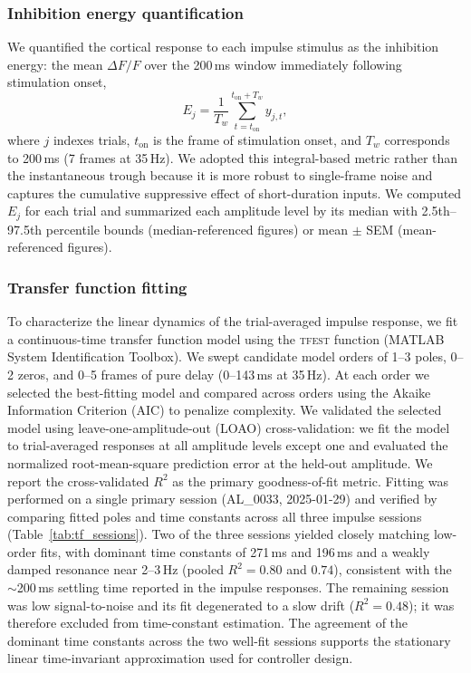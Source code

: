 \subsubsection*{Inhibition energy quantification}
\label{sec:inhib_energy}

We quantified the cortical response to each impulse stimulus as the
inhibition energy: the mean $\Delta F/F$ over the 200\,ms window
immediately following stimulation onset,
%
\begin{equation}
    E_{j} = \frac{1}{T_w}\sum_{t=t_{\mathrm{on}}}^{t_{\mathrm{on}}+T_w}
            y_{j,t},
    \label{eq:inhib_energy}
\end{equation}
%
where $j$ indexes trials, $t_{\mathrm{on}}$ is the frame of stimulation
onset, and $T_w$ corresponds to 200\,ms (7 frames at 35\,Hz). We adopted
this integral-based metric rather than the instantaneous trough because
it is more robust to single-frame noise and captures the cumulative
suppressive effect of short-duration inputs. We computed $E_j$ for each
trial and summarized each amplitude level by its median with 2.5th--97.5th
percentile bounds (median-referenced figures) or mean $\pm$ SEM
(mean-referenced figures).

\subsubsection*{Transfer function fitting}
\label{sec:tf_fitting}

To characterize the linear dynamics of the trial-averaged impulse
response, we fit a continuous-time transfer function model using the
\textsc{tfest} function (MATLAB System Identification Toolbox). We swept
candidate model orders of 1--3 poles, 0--2 zeros, and 0--5 frames of
pure delay (0--143\,ms at 35\,Hz). At each order we selected the
best-fitting model and compared across orders using the Akaike
Information Criterion (AIC) to penalize complexity. We validated the
selected model using leave-one-amplitude-out (LOAO) cross-validation: we
fit the model to trial-averaged responses at all amplitude levels except
one and evaluated the normalized root-mean-square prediction error at the
held-out amplitude. We report the cross-validated $R^2$ as the primary
goodness-of-fit metric. Fitting was performed on a single primary session
(AL\_0033, 2025-01-29) and verified by comparing fitted poles and time
constants across all three impulse sessions (Table~\ref{tab:tf_sessions}). Two
of the three sessions yielded closely matching low-order fits, with dominant
time constants of 271\,ms and 196\,ms and a weakly damped resonance near
2--3\,Hz (pooled $R^2 = 0.80$ and $0.74$), consistent with the $\sim$200\,ms
settling time reported in the impulse responses. The remaining session was
low signal-to-noise and its fit degenerated to a slow drift ($R^2 = 0.48$); it
was therefore excluded from time-constant estimation. The agreement of the
dominant time constants across the two well-fit sessions supports the
stationary linear time-invariant approximation used for controller design.

